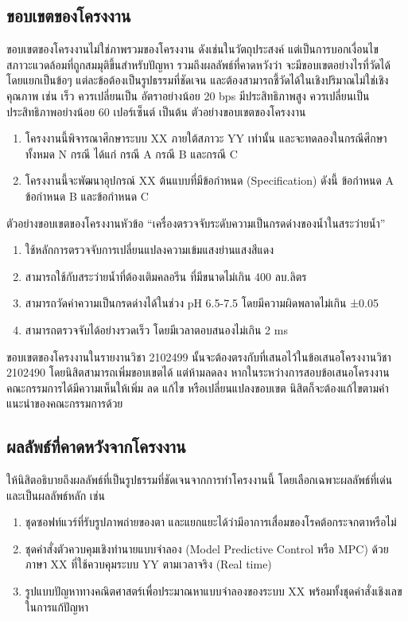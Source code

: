 \documentclass[11pt,a4paper]{article}
\begin{document}
\subsection{ขอบเขตของโครงงาน}
ขอบเขตของโครงงานไม่ใช่ภาพรวมของโครงงาน ดังเช่นในวัตถุประสงค์ แต่เป็นการบอกเงื่อนไข สภาวะแวดล้อมที่ถูกสมมุติขึ้นสำหรับปัญหา รวมถึงผลลัพธ์ที่คาดหวังว่า จะมีขอบเขตอย่างไรที่วัดได้ โดยแยกเป็นข้อๆ แต่ละข้อต้องเป็นรูปธรรมที่ชัดเจน และต้องสามารถชี้วัดได้ในเชิงปริมาณไม่ใช่เชิงคุณภาพ เช่น เร็ว ควรเปลี่ยนเป็น อัตราอย่างน้อย 20 bps มีประสิทธิภาพสูง ควรเปลี่ยนเป็น ประสิทธิภาพอย่างน้อย 60 เปอร์เซ็นต์ เป็นต้น
ตัวอย่างขอบเขตของโครงงาน
\begin{enumerate}
    \item โครงงานนี้พิจารณาศึกษาระบบ XX ภายใต้สภาวะ YY เท่านั้น และจะทดลองในกรณีศึกษาทั้งหมด N กรณี ได้แก่ กรณี A กรณี B และกรณี C
    \item โครงงานนี้จะพัฒนาอุปกรณ์ XX ต้นแบบที่มีข้อกำหนด (Specification) ดังนี้ ข้อกำหนด A ข้อกำหนด B และข้อกำหนด C
\end{enumerate}

ตัวอย่างขอบเขตของโครงงานหัวข้อ “เครื่องตรวจจับระดับความเป็นกรดด่างของน้ำในสระว่ายน้ำ”
\begin{enumerate}
    \item ใช้หลักการตรวจจับการเปลี่ยนแปลงความเข้มแสงย่านแสงสีแดง
    \item สามารถใช้กับสระว่ายน้ำที่ต้องเติมคลอรีน ที่มีขนาดไม่เกิน 400 ลบ.ลิตร
    \item สามารถวัดค่าความเป็นกรดด่างได้ในช่วง pH 6.5-7.5 โดยมีความผิดพลาดไม่เกิน ±0.05
    \item สามารถตรวจจับได้อย่างรวดเร็ว โดยมีเวลาตอบสนองไม่เกิน 2 ms
\end{enumerate}

ขอบเขตของโครงงานในรายงานวิชา 2102499 นั้นจะต้องตรงกับที่เสนอไว้ในข้อเสนอโครงงานวิชา 2102490 โดยนิสิตสามารถเพิ่มขอบเขตได้ แต่ห้ามลดลง หากในระหว่างการสอบข้อเสนอโครงงาน คณะกรรมการได้มีความเห็นให้เพิ่ม ลด แก้ไข หรือเปลี่ยนแปลงขอบเขต นิสิตก็จะต้องแก้ไขตามคำแนะนำของคณะกรรมการด้วย

\subsection{ผลลัพธ์ที่คาดหวังจากโครงงาน}

ให้นิสิตอธิบายถึงผลลัพธ์ที่เป็นรูปธรรมที่ชัดเจนจากการทำโครงงานนี้ โดยเลือกเฉพาะผลลัพธ์ที่เด่นและเป็นผลลัพธ์หลัก เช่น

\begin{enumerate}
    \item ชุดซอฟท์แวร์ที่รับรูปภาพถ่ายของตา และแยกแยะได้ว่ามีอาการเสื่อมของโรคต้อกระจกตาหรือไม่
    \item ชุดคำสั่งตัวควบคุมเชิงทำนายแบบจำลอง (Model Predictive Control หรือ MPC) ด้วยภาษา XX ที่ใช้ควบคุมระบบ YY ตามเวลาจริง (Real time)
    \item รูปแบบปัญหาทางคณิตศาสตร์เพื่อประมาณหาแบบจำลองของระบบ XX พร้อมทั้งชุดคำสั่งเชิงเลขในการแก้ปัญหา
\end{enumerate}
\end{document}
